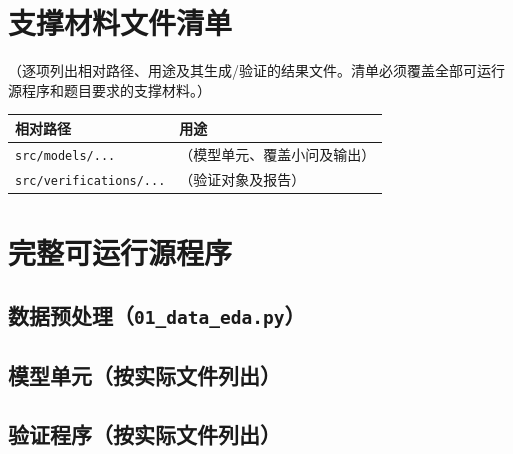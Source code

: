 \documentclass[12pt, a4paper]{article}
\begin{document}
\appendix
\section{支撑材料文件清单}

（逐项列出相对路径、用途及其生成/验证的结果文件。清单必须覆盖全部可运行源程序和题目要求的支撑材料。）

\begin{longtable}{p{}p{}}
\toprule
\textbf{相对路径} & \textbf{用途} \\
\midrule
\texttt{src/models/...} & （模型单元、覆盖小问及输出） \\
\texttt{src/verifications/...} & （验证对象及报告） \\
\bottomrule
\end{longtable}

\section{完整可运行源程序}


\subsection{数据预处理（\texttt{01\_data\_eda.py}）}
% 

\subsection{模型单元（按实际文件列出）}
% 

\subsection{验证程序（按实际文件列出）}
% 
\end{document}
